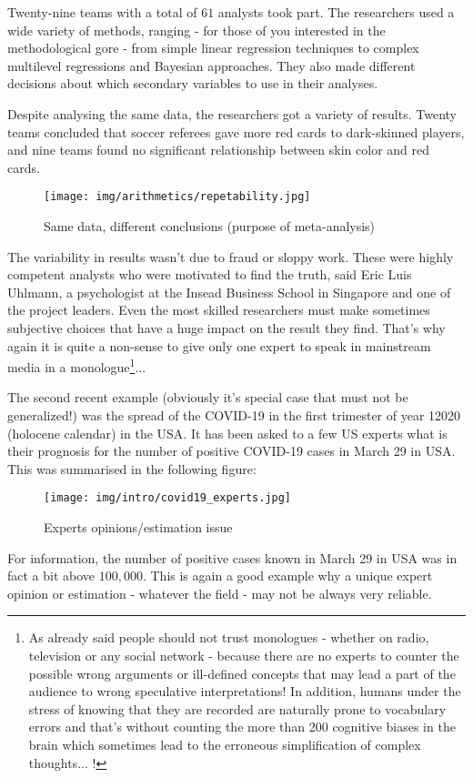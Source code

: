 	Twenty-nine teams with a total of $61$ analysts took part. The researchers used a wide variety of methods, ranging - for those of you interested in the methodological gore - from simple linear regression techniques to complex multilevel regressions and Bayesian approaches. They also made different decisions about which secondary variables to use in their analyses.

	Despite analysing the same data, the researchers got a variety of results. Twenty teams concluded that soccer referees gave more red cards to dark-skinned players, and nine teams found no significant relationship between skin color and red cards.
	\begin{figure}[H]
		\centering
		\texttt{[image: img/arithmetics/repetability.jpg]}
		\caption{Same data, different conclusions (purpose of meta-analysis)}
	\end{figure}
	The variability in results wasn't due to fraud or sloppy work. These were highly competent analysts who were motivated to find the truth, said Eric Luis Uhlmann, a psychologist at the Insead Business School in Singapore and one of the project leaders. Even the most skilled researchers must make sometimes subjective choices that have a huge impact on the result they find. That's why again it is quite a non-sense to give only one expert to speak in mainstream media in a monologue\footnote{As already said people should not trust monologues - whether on radio, television or any social network - because there are no experts to counter the possible wrong arguments or ill-defined concepts that may lead a part of the audience to wrong speculative interpretations! In addition, humans under the stress of knowing that they are recorded are naturally prone to vocabulary errors and that's without counting the more than 200 cognitive biases in the brain which sometimes lead to the erroneous simplification of complex thoughts... !}...
	
	The second recent example (obviously it's special case that must not be generalized!) was the spread of the COVID-19 in the first trimester of year 12020 (holocene calendar) in the USA. It has been asked to a few US experts what is their prognosis for the number of positive COVID-19 cases in March 29 in USA. This was summarised in the following figure:
	\begin{figure}[H]
		\centering
		\texttt{[image: img/intro/covid19\_experts.jpg]}
		\caption{Experts opinions/estimation issue}
	\end{figure}
	For information, the number of positive cases known in March 29 in USA was in fact a bit above $100,000$. This is again a good example why a unique expert opinion or estimation - whatever the field - may not be always very reliable.
	

